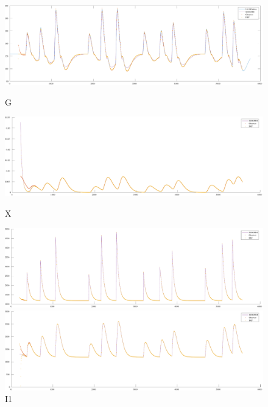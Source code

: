 \documentclass[platex]{jsarticle}
\begin{document}
\begin{figure}[H]
  \centering
  \begin{minipage}{0.65\columnwidth}
     \centering
     \includegraphics[width=\columnwidth]{fig/002g.pdf}
     \caption{G}
     \label{fig:002g}
  \end{minipage}
%
  \begin{minipage}{0.65\columnwidth}
     \centering
     \includegraphics[width=\columnwidth]{fig/002x.pdf}
     \caption{X}
     \label{fig:002x}
  \end{minipage}
%
  \begin{minipage}{0.65\columnwidth}
     \centering
     \includegraphics[width=\columnwidth]{fig/002i1.pdf}
     \caption{I1}
     \label{fig:002i1}
  \end{minipage}
%
  \begin{minipage}{0.65\columnwidth}
     \centering
     \includegraphics[width=\columnwidth]{fig/002i2.pdf}

\end{minipage}
\end{figure}
\end{document}
